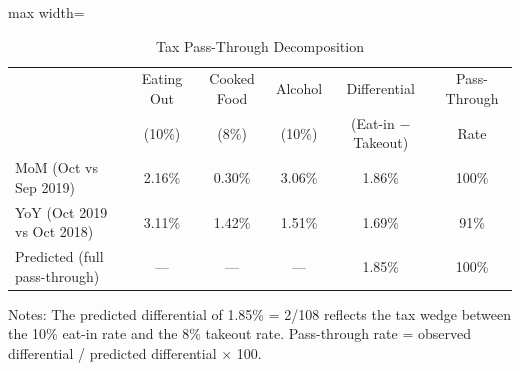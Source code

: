 \begin{table}[H]
\centering
\caption{Tax Pass-Through Decomposition}
\begin{adjustbox}{max width=\textwidth}
\begin{threeparttable}
\begin{tabular}{lccccc}
\toprule
 & Eating Out & Cooked Food & Alcohol & Differential & Pass-Through \\
 & (10\%) & (8\%) & (10\%) & (Eat-in $-$ Takeout) & Rate \\
\midrule
MoM (Oct vs Sep 2019) & 2.16\% & 0.30\% & 3.06\% & 1.86\% & 100\% \\
YoY (Oct 2019 vs Oct 2018) & 3.11\% & 1.42\% & 1.51\% & 1.69\% & 91\% \\
\midrule
Predicted (full pass-through) & --- & --- & --- & 1.85\% & 100\% \\
\bottomrule
\end{tabular}
\begin{tablenotes}[flushleft]
\small
\item Notes: The predicted differential of 1.85\% = 2/108 reflects the tax wedge 
between the 10\% eat-in rate and the 8\% takeout rate. 
Pass-through rate = observed differential / predicted differential $\times$ 100.
\end{tablenotes}
\end{threeparttable}
\end{adjustbox}
\label{tab:passthrough}
\end{table}
